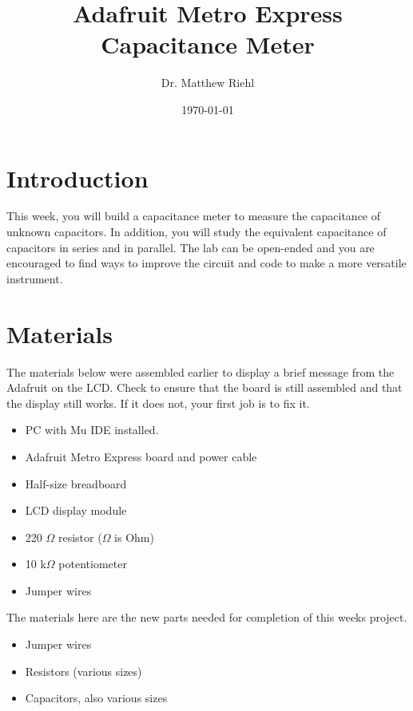 \documentclass[]{article}
\title{Adafruit Metro Express Capacitance Meter}
\author{Dr. Matthew Riehl}
\date {\today}
\begin{document}
\newcommand{\ds}{\displaystyle}
\maketitle

\section{Introduction}

This week, you will build a capacitance meter  to measure the capacitance of unknown capacitors.  In addition, you will study the equivalent capacitance of capacitors in series and in parallel.  The lab can be open-ended and you are encouraged to find ways to improve the circuit and code to make a more versatile instrument.

\section{Materials}
The materials below were assembled earlier to display a brief message from the Adafruit on the LCD.  Check to ensure that the board is still assembled and that the display still works.  If it does not, your first job is to fix it.
\begin{itemize}
	\item PC with Mu IDE installed.
	\item Adafruit Metro Express board and power cable
	\item Half-size breadboard
	\item LCD display module
	\item 220 $\Omega$ resistor ($\Omega$ is Ohm)
	\item 10 k$\Omega$ potentiometer
	\item Jumper wires
\end{itemize}
The materials here are the new parts needed for completion of this weeks project.
\begin{itemize}
	\item Jumper wires
	\item Resistors (various sizes)
	\item Capacitors, also various sizes
\end{itemize}
\end{document}

